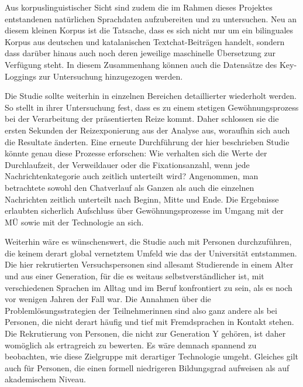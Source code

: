 Aus korpuslinguistischer Sicht sind zudem die im Rahmen dieses Projektes entstandenen natürlichen Sprachdaten aufzubereiten und zu untersuchen. Neu an diesem kleinen Korpus ist die Tatsache, dass es sich nicht nur um ein bilinguales Korpus aus deutschen und katalanischen Textchat-Beiträgen handelt, sondern dass darüber hinaus auch noch deren jeweilige maschinelle Übersetzung zur Verfügung steht. In diesem Zusammenhang können auch die Datensätze des Key-Loggings zur Untersuchung hinzugezogen werden. 


Die Studie sollte weiterhin in einzelnen Bereichen detaillierter wiederholt werden. So stellt \citet[]{obrien_eye_2009} in ihrer Untersuchung fest, dass es zu einem stetigen Gewöhnungsprozess bei der Verarbeitung der präsentierten Reize kommt. Daher schlossen sie die ersten Sekunden der Reizexponierung aus der Analyse aus, woraufhin sich auch die Resultate änderten. Eine erneute Durchführung der hier beschrieben Studie könnte genau diese Prozesse erforschen: Wie verhalten sich die Werte der Durchlaufzeit, der Verweildauer oder die Fixationsanzahl, wenn jede Nachrichtenkategorie auch zeitlich unterteilt wird? Angenommen, man betrachtete sowohl den Chatverlauf als Ganzen als auch die einzelnen Nachrichten zeitlich unterteilt nach Beginn, Mitte und Ende. Die Ergebnisse erlaubten sicherlich Aufschluss über Gewöhnungsprozesse im Umgang mit der MÜ sowie mit der Technologie an sich. 

Weiterhin wäre es wünschenswert, die Studie auch mit Personen durchzuführen, die keinem derart global vernetztem Umfeld wie das der Universität entstammen. Die hier rekrutierten Versuchspersonen sind allesamt Studierende in einem Alter und aus einer Generation, für die es weitaus selbstverständlicher ist, mit verschiedenen Sprachen im Alltag und im Beruf konfrontiert zu sein, als es noch vor wenigen Jahren der Fall war. Die Annahmen über die Problemlösungsstrategien der Teilnehmer{\textperiodcentered}innen sind also ganz andere als bei Personen, die nicht derart häufig und tief mit Fremdsprachen in Kontakt stehen. Die Rekrutierung von Personen, die nicht zur Generation Y gehören, ist daher womöglich als ertragreich zu bewerten. Es wäre demnach spannend zu beobachten, wie diese Zielgruppe mit derartiger Technologie umgeht. Gleiches gilt auch für Personen, die einen formell niedrigeren Bildungsgrad aufweisen als auf akademischem Niveau.

